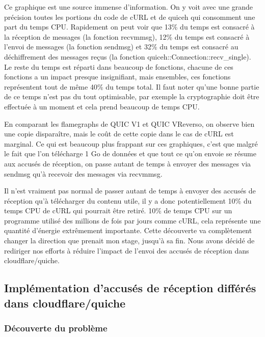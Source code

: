 Ce graphique est une source immense d'information. On y voit avec une grande précision toutes les portions du code de cURL et de quiceh qui consomment une part du temps CPU.
Rapidement on peut voir que 13\% du temps est consacré à la réception de messages (la fonction recvmmsg), 12\% du temps est consacré à l'envoi de messages (la fonction sendmsg) et 32\% du temps est consacré au déchiffrement des messages reçus (la fonction quiceh::Connection::recv\_single). Le reste du temps est réparti dans beaucoup de fonctions, chacune de ces fonctions a un impact presque insignifiant, mais ensembles, ces fonctions représentent tout de même 40\% du temps total. Il faut noter qu'une bonne partie de ce temps n'est pas du tout optimisable, par exemple la cryptographie doit être effectuée à un moment et cela prend beaucoup de temps CPU.

En comparant les flamegraphs de QUIC V1 et QUIC VReverso, on observe bien une copie disparaître, mais le coût de cette copie dans le cas de cURL est marginal. Ce qui est beaucoup plus frappant sur ces graphiques, c'est que malgré le fait que l'on télécharge 1 Go de données et que tout ce qu'on envoie se résume aux accusés de réception, on passe autant de temps à envoyer des messages via sendmsg qu'à recevoir des messages via recvmmsg.

\vspace{0.5cm}

Il n'est vraiment pas normal de passer autant de temps à envoyer des accusés de réception qu'à télécharger du contenu utile, il y a donc potentiellement 10\% du temps CPU de cURL qui pourrait être retiré. 10\% de temps CPU sur un programme utilisé des millions de fois par jours comme cURL, cela représente une quantité d'énergie extrêmement importante. Cette découverte va complètement changer la direction que prenait mon stage, jusqu'à sa fin. Nous avons décidé de rediriger nos efforts à réduire l'impact de l'envoi des accusés de réception dans cloudflare/quiche.

\newpage

\subsection{Implémentation d'accusés de réception différés dans cloudflare/quiche}

\subsubsection{Découverte du problème}

